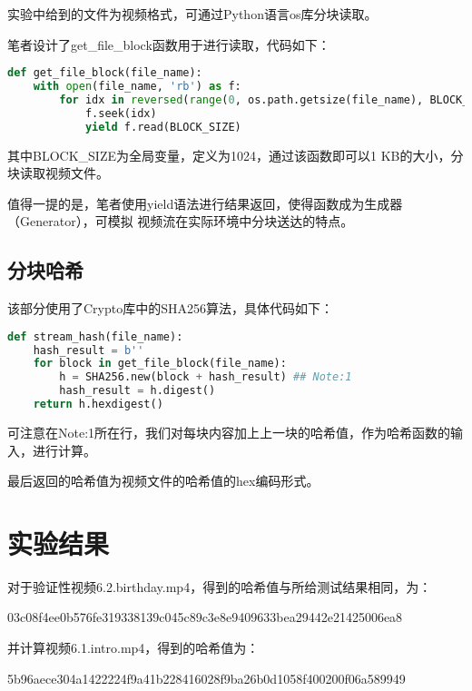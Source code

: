 实验中给到的文件为视频格式，可通过Python语言os库分块读取。

笔者设计了get\_file\_block函数用于进行读取，代码如下：

\begin{lstlisting}[language = Python]
def get_file_block(file_name):
    with open(file_name, 'rb') as f:
        for idx in reversed(range(0, os.path.getsize(file_name), BLOCK_SIZE)):
            f.seek(idx)
            yield f.read(BLOCK_SIZE)
\end{lstlisting}

其中BLOCK\_SIZE为全局变量，定义为1024，通过该函数即可以1 KB的大小，分块读取视频文件。

值得一提的是，笔者使用yield语法进行结果返回，使得函数成为生成器（Generator），可模拟
视频流在实际环境中分块送达的特点。

\subsection{分块哈希}

该部分使用了Crypto库中的SHA256算法，具体代码如下：

\begin{lstlisting}[language = Python]
def stream_hash(file_name):
    hash_result = b''
    for block in get_file_block(file_name):
        h = SHA256.new(block + hash_result) ## Note:1
        hash_result = h.digest()
    return h.hexdigest()
\end{lstlisting}

可注意在Note:1所在行，我们对每块内容加上上一块的哈希值，作为哈希函数的输入，进行计算。

最后返回的哈希值为视频文件的哈希值的hex编码形式。

\section{实验结果}

对于验证性视频6.2.birthday.mp4，得到的哈希值与所给测试结果相同，为：
\begin{center}
    03c08f4ee0b576fe319338139c045c89c3e8e9409633bea29442e21425006ea8
\end{center}

并计算视频6.1.intro.mp4，得到的哈希值为：
\begin{center}
    5b96aece304a1422224f9a41b228416028f9ba26b0d1058f400200f06a589949
\end{center}